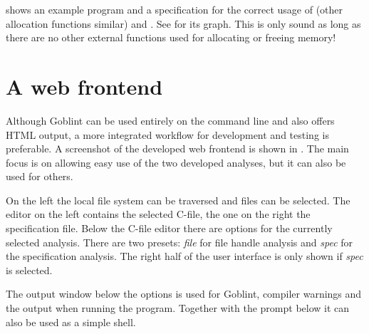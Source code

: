  shows an example program and  a specification for the correct usage of  (other allocation functions similar) and . See  for its graph.
This is only sound as long as there are no other external functions used for allocating or freeing memory!






\chapter{A web frontend}
Although Goblint can be used entirely on the command line and also offers HTML output, a more integrated workflow for development and testing is preferable.
A screenshot of the developed web frontend is shown in .
The main focus is on allowing easy use of the two developed analyses, but it can also be used for others.

On the left the local file system can be traversed and files can be selected.
The editor on the left contains the selected C-file, the one on the right the specification file.
Below the C-file editor there are options for the currently selected analysis. There are two presets: \textit{file} for file handle analysis and \textit{spec} for the specification analysis. The right half of the user interface is only shown if \textit{spec} is selected.

The output window below the options is used for Goblint, compiler warnings and the output when running the program. Together with the prompt below it can also be used as a simple shell.


